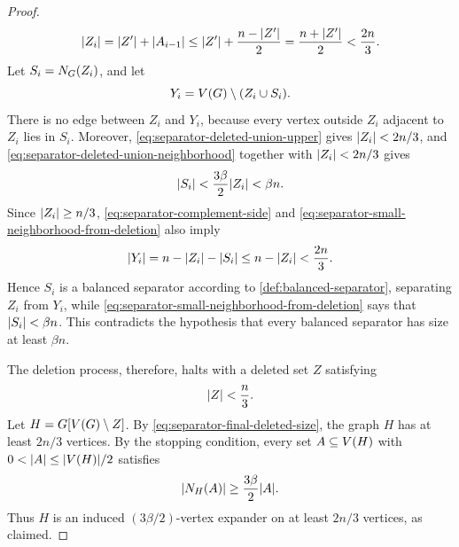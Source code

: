 \begin{proof}
	\begin{equation}
		\label{eq:separator-deleted-union-upper}
		\lvert Z_i\rvert=\lvert Z'\rvert+\lvert A_{i-1}\rvert\leq \lvert Z'\rvert+\frac{n-\lvert Z'\rvert}{2}=\frac{n+\lvert Z'\rvert}{2}<\frac{2n}{3}.
	\end{equation}
	Let \(S_i=N_{G}(Z_i)\), and let
	\begin{equation}
		\label{eq:separator-complement-side}
		Y_i=V(G)\setminus (Z_i\cup S_i).
	\end{equation}
	There is no edge between \(Z_i\) and \(Y_i\), because every vertex outside \(Z_i\) adjacent to \(Z_i\) lies in \(S_i\). Moreover, \cref{eq:separator-deleted-union-upper} gives \(\lvert Z_i\rvert<2n/3\), and \cref{eq:separator-deleted-union-neighborhood} together with \(\lvert Z_i\rvert<2n/3\) gives
	\begin{equation}
		\label{eq:separator-small-neighborhood-from-deletion}
		\lvert S_i\rvert<\frac{3\beta}{2}\lvert Z_i\rvert<\beta n.
	\end{equation}
	Since \(\lvert Z_i\rvert\geq n/3\), \cref{eq:separator-complement-side} and \cref{eq:separator-small-neighborhood-from-deletion} also imply
	\begin{equation}
		\label{eq:separator-other-side-balanced}
		\lvert Y_i\rvert=n-\lvert Z_i\rvert-\lvert S_i\rvert\leq n-\lvert Z_i\rvert<\frac{2n}{3}.
	\end{equation}
	Hence \(S_i\) is a balanced separator according to \cref{def:balanced-separator}, separating \(Z_i\) from \(Y_i\), while \cref{eq:separator-small-neighborhood-from-deletion} says that \(\lvert S_i\rvert<\beta n\). This contradicts the hypothesis that every balanced separator has size at least \(\beta n\).

	The deletion process, therefore, halts with a deleted set \(Z\) satisfying
	\begin{equation}
		\label{eq:separator-final-deleted-size}
		\lvert Z\rvert<\frac{n}{3}.
	\end{equation}
	Let \(H=G[V(G)\setminus Z]\). By \cref{eq:separator-final-deleted-size}, the graph \(H\) has at least \(2n/3\) vertices. By the stopping condition, every set \(A\subseteq V(H)\) with \(0<\lvert A\rvert\leq \lvert V(H)\rvert/2\) satisfies
	\begin{equation}
		\label{eq:separator-final-expansion}
		\lvert N_H(A)\rvert\geq \frac{3\beta}{2}\lvert A\rvert.
	\end{equation}
	Thus \(H\) is an induced \((3\beta/2)\)-vertex expander on at least \(2n/3\) vertices, as claimed.
\end{proof}

